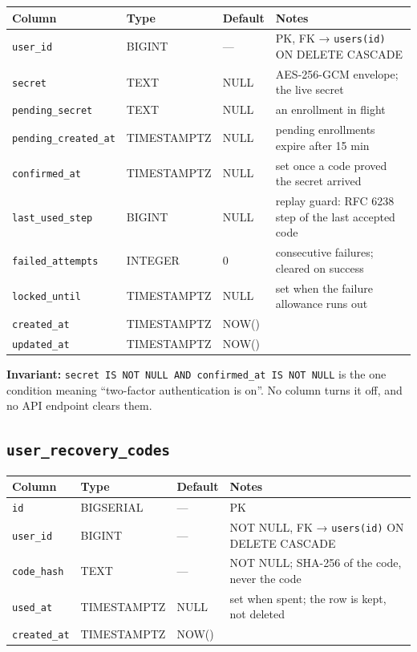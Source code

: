 \documentclass[12pt,a4paper,twoside]{report}
\newcommand{\code}[1]{\texttt{#1}}
\begin{document}
\begin{table}[H]
  \centering\small
  \begin{tabular}{@{}llll@{}}
    \toprule
    \textbf{Column} & \textbf{Type} & \textbf{Default} & \textbf{Notes} \\
    \midrule
    \code{user\_id}            & BIGINT      & ---   & PK, FK → \code{users(id)} ON DELETE CASCADE \\
    \code{secret}              & TEXT        & NULL  & AES-256-GCM envelope; the live secret \\
    \code{pending\_secret}     & TEXT        & NULL  & an enrollment in flight \\
    \code{pending\_created\_at}& TIMESTAMPTZ & NULL  & pending enrollments expire after 15 min \\
    \code{confirmed\_at}       & TIMESTAMPTZ & NULL  & set once a code proved the secret arrived \\
    \code{last\_used\_step}    & BIGINT      & NULL  & replay guard: RFC 6238 step of the last accepted code \\
    \code{failed\_attempts}    & INTEGER     & 0     & consecutive failures; cleared on success \\
    \code{locked\_until}       & TIMESTAMPTZ & NULL  & set when the failure allowance runs out \\
    \code{created\_at}         & TIMESTAMPTZ & NOW() & \\
    \code{updated\_at}         & TIMESTAMPTZ & NOW() & \\
    \bottomrule
  \end{tabular}
\end{table}

\noindent\textbf{Invariant:} \code{secret IS NOT NULL AND confirmed\_at IS NOT
NULL} is the one condition meaning ``two-factor authentication is on''. No column
turns it off, and no API endpoint clears them.

\subsection*{\texttt{user\_recovery\_codes}}

\begin{table}[H]
  \centering\small
  \begin{tabular}{@{}llll@{}}
    \toprule
    \textbf{Column} & \textbf{Type} & \textbf{Default} & \textbf{Notes} \\
    \midrule
    \code{id}         & BIGSERIAL   & ---   & PK \\
    \code{user\_id}   & BIGINT      & ---   & NOT NULL, FK → \code{users(id)} ON DELETE CASCADE \\
    \code{code\_hash} & TEXT        & ---   & NOT NULL; SHA-256 of the code, never the code \\
    \code{used\_at}   & TIMESTAMPTZ & NULL  & set when spent; the row is kept, not deleted \\
    \code{created\_at}& TIMESTAMPTZ & NOW() & \\
    \bottomrule
  \end{tabular}
\end{table}
\end{document}
